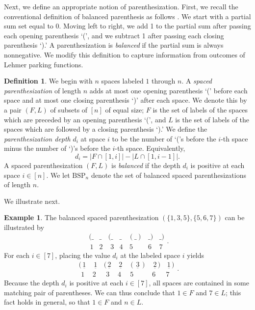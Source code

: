 \documentclass{amsart}
\newcommand{\BSP}{\mathrm{BSP}}
\theoremstyle{definition}
\newtheorem{example}{Example}
\theoremstyle{definition}
\newtheorem{definition}{Definition}[section]
\theoremstyle{remark}
\begin{document}
Next, we define an appropriate notion of parenthesization. 
First, we recall the conventional definition of balanced parenthesis as follows \cite[Section 1.1]{catalan_ex}. 
We start with a partial sum set equal to 0. Moving left to right, we add 1 to the partial sum after passing each opening parenthesis `(', and we subtract 1 after passing each closing parenthesis `).' 
A parenthesization is \textit{balanced} if the partial sum is always nonnegative. 
We modify this definition to capture information from outcomes of Lehmer parking functions.
\begin{definition}\label{def:bsp_n}
    We begin with $n$ spaces labeled $1$ through $n$. A \textit{spaced parenthesization} of length $n$ adds at most one opening parenthesis `(' before each space and at most one closing parenthesis `)' after each space.
    We denote this by a pair $(F,L)$ of subsets of $[n]$ of equal size; $F$ is the set of labels of the spaces which are preceded by an opening parenthesis `(', and $L$ is the set of labels of the spaces which are followed by a closing parenthesis `).' 
    We define the \textit{parenthesization depth} $d_i$ at space $i$ to be the number of `('s before the $i$-th space minus the number of `)'s before the $i$-th space. 
    Equivalently, \[d_i=|F\cap[1,i]|-|L\cap[1,i-1]|.\] 
    A spaced parenthesization $(F,L)$ is \textit{balanced} if the depth $d_i$ is positive at each space $i\in[n]$. We let $\BSP_n$ denote the set of balanced spaced parenthesizations of length $n$.
\end{definition}
We illustrate  next. 
\begin{example}\label{ex:balanced ex} 
The balanced spaced parenthesization $(\{1,3,5\},\{5,6,7\})$ can be illustrated by
\[\begin{smallmatrix}(\_&\_&(\_&\_&(\_)&\_)&\_)\\\,1&2&\,\,3&4&\,5\,&6\,\,&7\,\end{smallmatrix}.\]
For each $i\in[7]$, placing the value $d_i$ at the labeled space $i$ yields
\[\begin{smallmatrix}(\underline{\,1\,}&\underline{\,1\,}&(\underline{\,2\,}&\underline{\,2\,}&(\underline{\,3\,})&\underline{\,2\,})&\underline{\,1\,})\\\,\,1&2&\,\,3&4&\,5\,&6\,\,&7\,\,\end{smallmatrix}.\]
Because the depth $d_i$ is positive at each $i\in[7]$, all spaces are contained in some matching pair of parentheses. We can thus conclude that $1\in F$ and $7\in L$; this fact holds in general, so that $1\in F$ and $n\in L$. 
\end{example}
\end{document}

